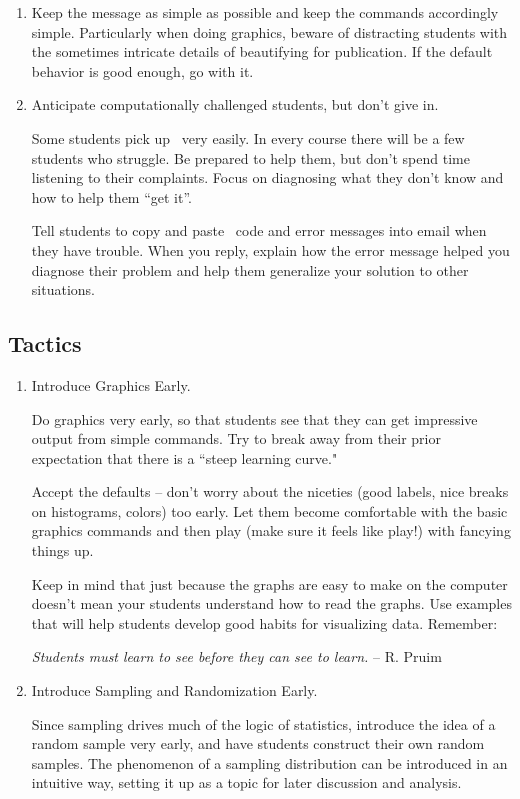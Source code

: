 \begin{enumerate}
\item Keep the message as simple as possible and keep the commands
  accordingly simple.  Particularly when doing graphics, beware of distracting
  students with the sometimes intricate details of beautifying for
  publication.  If the default behavior is good enough, go with it.

\item
Anticipate computationally challenged students, but don't give in.

Some students pick up \R\ very easily.  In every course there will be a few students who
struggle.  Be prepared to help them, but don't  spend time listening to their complaints.
Focus on diagnosing what they don't know and how to help them ``get it''.

Tell students to copy and paste \R\ code and error messages into email when they
have trouble.  When you reply, explain how the error message helped you diagnose their
problem and help them generalize your solution to other situations.
%
\end{enumerate}

\subsection{Tactics}

\begin{enumerate}
\item
Introduce Graphics Early.


Do graphics very early, so that students see that they can get
impressive output from simple commands.  Try to break away from their
prior expectation that there is a ``steep learning curve."

Accept the defaults -- don't worry about the niceties (good labels,
nice breaks on histograms, colors) too early.  Let them become
comfortable with the basic graphics commands and then play (make sure
it feels like play!) with fancying things up.  

Keep in mind that just because the graphs are easy to make on the computer doesn't 
mean your students understand how to read the graphs.  
Use examples that will
help students develop good habits for visualizing data.  Remember:

\begin{center}
\emph{
Students must learn to see before they can see to learn.}  -- R. Pruim
\end{center}

\item Introduce Sampling and Randomization Early.

Since sampling drives much of the logic of statistics, introduce the idea of a random sample very
early, and have students construct their own random samples.  The
phenomenon of a sampling distribution can be introduced in an
intuitive way, setting it up as a topic for later discussion and analysis.


\end{enumerate}

